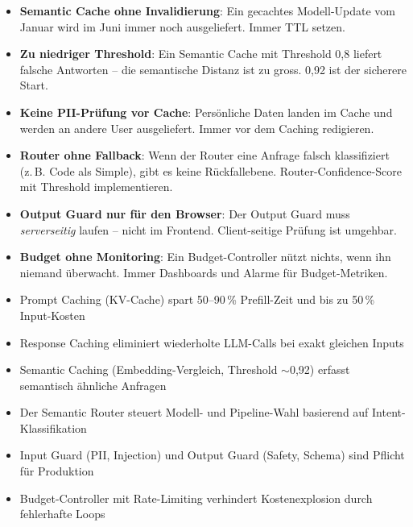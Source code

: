 \begin{itemize}[leftmargin=*]
    \item \textbf{Semantic Cache ohne Invalidierung}: Ein gecachtes Modell-Update vom Januar wird im Juni immer noch ausgeliefert. Immer TTL setzen.
    \item \textbf{Zu niedriger Threshold}: Ein Semantic Cache mit Threshold 0,8 liefert falsche Antworten -- die semantische Distanz ist zu gross. 0,92 ist der sicherere Start.
    \item \textbf{Keine PII-Prüfung vor Cache}: Persönliche Daten landen im Cache und werden an andere User ausgeliefert. Immer vor dem Caching redigieren.
    \item \textbf{Router ohne Fallback}: Wenn der Router eine Anfrage falsch klassifiziert (z.\,B. Code als Simple), gibt es keine Rückfallebene. Router-Confidence-Score mit Threshold implementieren.
    \item \textbf{Output Guard nur für den Browser}: Der Output Guard muss \textit{serverseitig} laufen -- nicht im Frontend. Client-seitige Prüfung ist umgehbar.
    \item \textbf{Budget ohne Monitoring}: Ein Budget-Controller nützt nichts, wenn ihn niemand überwacht. Immer Dashboards und Alarme für Budget-Metriken.
\end{itemize}

\begin{zusammenfassung}
\begin{itemize}[leftmargin=*]
    \item Prompt Caching (KV-Cache) spart 50--90\,\% Prefill-Zeit und bis zu 50\,\% Input-Kosten
    \item Response Caching eliminiert wiederholte LLM-Calls bei exakt gleichen Inputs
    \item Semantic Caching (Embedding-Vergleich, Threshold $\sim$0,92) erfasst semantisch ähnliche Anfragen
    \item Der Semantic Router steuert Modell- und Pipeline-Wahl basierend auf Intent-Klassifikation
    \item Input Guard (PII, Injection) und Output Guard (Safety, Schema) sind Pflicht für Produktion
    \item Budget-Controller mit Rate-Limiting verhindert Kostenexplosion durch fehlerhafte Loops
\end{itemize}
\end{zusammenfassung}

